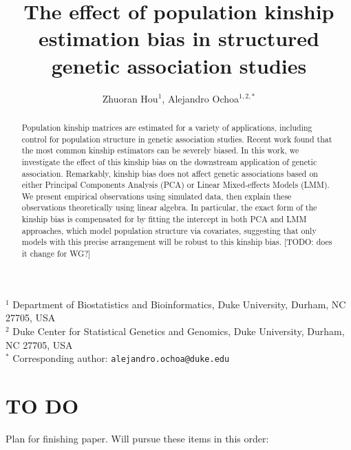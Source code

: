 \documentclass[11pt]{article}
\title{\Large \textbf{The effect of population kinship estimation bias in structured genetic association studies}}
\author{Zhuoran Hou$^1$, Alejandro Ochoa$^{1,2,*}$}
\date{}
\begin{document}
\maketitle

\noindent
$^1$ Department of Biostatistics and Bioinformatics, Duke University, Durham, NC 27705, USA \\
$^2$ Duke Center for Statistical Genetics and Genomics, Duke University, Durham, NC 27705, USA \\
$^*$ Corresponding author: \texttt{alejandro.ochoa@duke.edu}


\begin{abstract}
  Population kinship matrices are estimated for a variety of applications, including control for population structure in genetic association studies.
  Recent work found that the most common kinship estimators can be severely biased.
  In this work, we investigate the effect of this kinship bias on the downstream application of genetic association.
  Remarkably, kinship bias does not affect genetic associations based on either Principal Components Analysis (PCA) or Linear Mixed-effects Models (LMM).
  We present empirical observations using simulated data, then explain these observations theoretically using linear algebra.
  In particular, the exact form of the kinship bias is compensated for by fitting the intercept in both PCA and LMM approaches, which model population structure via covariates, suggesting that only models with this precise arrangement will be robust to this kinship bias.
  [TODO: does it change for WG?]
\end{abstract}

\clearpage

\tableofcontents

\clearpage
	
\section{TO DO}

Plan for finishing paper.
Will pursue these items in this order:
\end{document}
